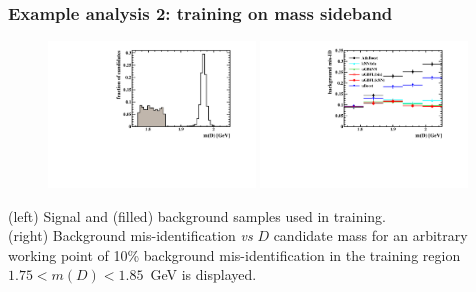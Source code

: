 \documentclass{beamer}
\begin{document}
\begin{frame}[t]
    \frametitle{Example analysis 2: training on mass sideband}

    \begin{figure}[] 
        \centering 
        \includegraphics[width=0.49\textwidth]{../paperdraft/graphs2/mD_train.pdf}
        \includegraphics[width=0.49\textwidth]{../paperdraft/graphs2/MD_eff.pdf}
    \end{figure}

    (left) Signal and (filled) background samples used in training.  \\
    (right) Background mis-identification {\em vs} $D$ candidate mass for an arbitrary working point of 10\% background mis-identification in the training region $1.75 < m(D) < 1.85$~GeV is displayed.
\end{frame}




\end{document}
